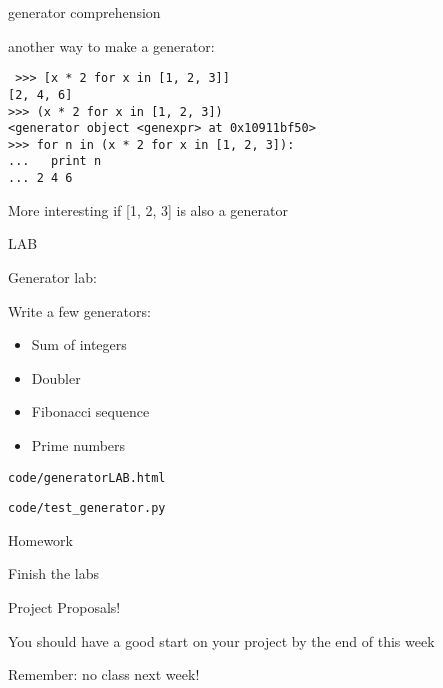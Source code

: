 \documentclass{beamer}
\begin{document}
\begin{frame}[fragile]{generator comprehension}

{\Large another way to make a generator:}

\begin{verbatim}
￼>>> [x * 2 for x in [1, 2, 3]]
[2, 4, 6]
>>> (x * 2 for x in [1, 2, 3])
<generator object <genexpr> at 0x10911bf50>
>>> for n in (x * 2 for x in [1, 2, 3]):
...   print n
... 2 4 6
\end{verbatim}

\vfill
More interesting if [1, 2, 3] is also a generator

\end{frame}


\begin{frame}[fragile]{LAB}

\vfill
{\LARGE Generator lab:}

\vfill
{\Large Write a few generators:}
\begin{itemize}
  \item Sum of integers
  \item Doubler
  \item Fibonacci sequence
  \item Prime numbers
\end{itemize}

\vfill
{\Large \verb|code/generatorLAB.html|}

{\Large \verb|code/test_generator.py|}

\end{frame}



\begin{frame}[fragile]{Homework}

\vfill
{\Large Finish the labs}

\vfill
{\LARGE Project Proposals!}

\vfill
{\Large You should have a good start on your project by the end of this week}

\vfill
{\Large Remember: no class next week!}

\vfill

\end{frame}
\end{document}
